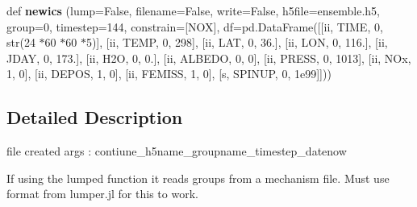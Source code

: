 \begin{DoxyCompactItemize}
def {\bfseries newics} (lump=False, filename=False, write=False, h5file=\textquotesingle{}ensemble.\+h5\textquotesingle{}, group=0, timestep=144, constrain=\mbox{[}\textquotesingle{}N\+OX\textquotesingle{}\mbox{]}, df=pd.\+Data\+Frame(\mbox{[}\mbox{[}\textquotesingle{}ii\textquotesingle{}, \textquotesingle{}T\+I\+ME\textquotesingle{}, \textquotesingle{}0\textquotesingle{}, str(24 $\ast$60 $\ast$60 $\ast$5)\mbox{]}, \mbox{[}\textquotesingle{}ii\textquotesingle{}, \textquotesingle{}T\+E\+MP\textquotesingle{}, \textquotesingle{}0\textquotesingle{}, \textquotesingle{}298\textquotesingle{}\mbox{]}, \mbox{[}\textquotesingle{}ii\textquotesingle{}, \textquotesingle{}L\+AT\textquotesingle{}, \textquotesingle{}0\textquotesingle{}, \textquotesingle{}36.\textquotesingle{}\mbox{]}, \mbox{[}\textquotesingle{}ii\textquotesingle{}, \textquotesingle{}L\+ON\textquotesingle{}, \textquotesingle{}0\textquotesingle{}, \textquotesingle{}116.\textquotesingle{}\mbox{]}, \mbox{[}\textquotesingle{}ii\textquotesingle{}, \textquotesingle{}J\+D\+AY\textquotesingle{}, \textquotesingle{}0\textquotesingle{}, \textquotesingle{}173.\textquotesingle{}\mbox{]}, \mbox{[}\textquotesingle{}ii\textquotesingle{}, \textquotesingle{}H2O\textquotesingle{}, \textquotesingle{}0\textquotesingle{}, \textquotesingle{}0.\textquotesingle{}\mbox{]}, \mbox{[}\textquotesingle{}ii\textquotesingle{}, \textquotesingle{}A\+L\+B\+E\+DO\textquotesingle{}, \textquotesingle{}0\textquotesingle{}, \textquotesingle{}0\textquotesingle{}\mbox{]}, \mbox{[}\textquotesingle{}ii\textquotesingle{}, \textquotesingle{}P\+R\+E\+SS\textquotesingle{}, \textquotesingle{}0\textquotesingle{}, \textquotesingle{}1013\textquotesingle{}\mbox{]}, \mbox{[}\textquotesingle{}ii\textquotesingle{}, \textquotesingle{}N\+Ox\textquotesingle{}, \textquotesingle{}1\textquotesingle{}, \textquotesingle{}0\textquotesingle{}\mbox{]}, \mbox{[}\textquotesingle{}ii\textquotesingle{}, \textquotesingle{}D\+E\+P\+OS\textquotesingle{}, \textquotesingle{}1\textquotesingle{}, \textquotesingle{}0\textquotesingle{}\mbox{]}, \mbox{[}\textquotesingle{}ii\textquotesingle{}, \textquotesingle{}F\+E\+M\+I\+SS\textquotesingle{}, \textquotesingle{}1\textquotesingle{}, \textquotesingle{}0\textquotesingle{}\mbox{]}, \mbox{[}\textquotesingle{}s\textquotesingle{}, \textquotesingle{}S\+P\+I\+N\+UP\textquotesingle{}, \textquotesingle{}0\textquotesingle{}, \textquotesingle{}1e99\textquotesingle{}\mbox{]}\mbox{]}))
\end{DoxyCompactItemize}


\subsection{Detailed Description}
\begin{DoxyVerb}file created args : contiune_h5name_groupname_timestep_datenow


If using the lumped function it reads groups from a mechanism file.
Must use format from lumper.jl for this to work.\end{DoxyVerb}
 